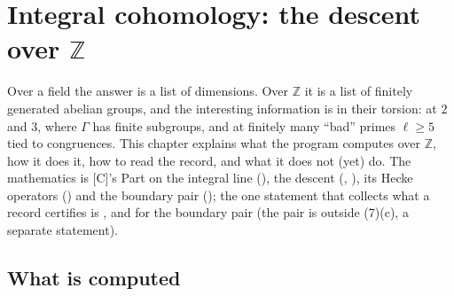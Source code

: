 \documentclass[11pt,openany]{report}
\newcommand{\Z}{\mathbb{Z}}
\begin{document}
\chapter{Integral cohomology: the descent over \texorpdfstring{$\Z$}{Z}}\label{ch:integral}

Over a field the answer is a list of dimensions. Over $\Z$ it is a list of finitely generated abelian groups, and the
interesting information is in their torsion: at $2$ and $3$, where $\Gamma$ has finite subgroups, and at finitely many
``bad'' primes $\ell\ge5$ tied to congruences. This chapter explains what the program computes over $\Z$, how it does it,
how to read the record, and what it does not (yet) do. The mathematics is [C]'s Part on the integral line
({}), the descent ({}, {}), its Hecke operators
({}) and the boundary pair ({}); the one statement that collects
what a record certifies is {}, and for the boundary pair {}
(the pair is outside {}(7)(c), a separate statement).

\section{What is computed}\label{sec:int-what}
\end{document}
